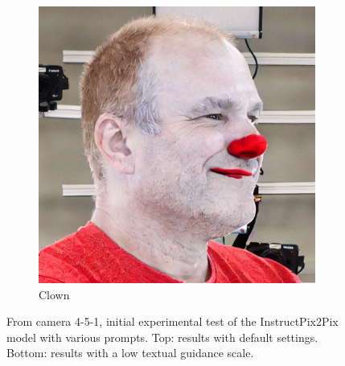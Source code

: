 \begin{figure}[ht]
\begin{subfigure}{0.18\linewidth}
        \includegraphics[width=\textwidth]{Figures/naive/low_cfg/ipix2pix_sven_clown/0-4-5-1-5648_230239_266.png}
		\caption{Clown}
	\end{subfigure}
    \caption{From camera 4-5-1, initial experimental test of the InstructPix2Pix model with various prompts. Top: results with default settings. Bottom: results with a low textual guidance scale.}
    \label{fig:instructpix2pix_initial_4-5-1}

\end{figure}

